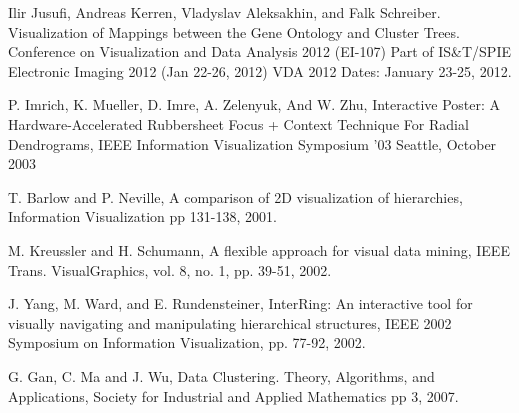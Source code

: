 
\begin{thebibliography}{99}

Ilir Jusufi, Andreas Kerren, Vladyslav Aleksakhin, and Falk Schreiber. Visualization of Mappings between the Gene Ontology and Cluster Trees. Conference on Visualization and Data Analysis 2012 (EI-107) Part of IS&T/SPIE Electronic Imaging 2012 (Jan 22-26, 2012) VDA 2012 Dates: January 23-25, 2012.


P. Imrich, K. Mueller, D. Imre, A. Zelenyuk, And W. Zhu, Interactive Poster: A Hardware-Accelerated Rubbersheet Focus + Context Technique For Radial Dendrograms, IEEE Information Visualization Symposium '03 Seattle, October 2003


T. Barlow and P. Neville, A comparison of 2D visualization of hierarchies, Information Visualization pp 131-138, 2001.

M. Kreussler and H. Schumann, A flexible approach for visual data mining, IEEE Trans. VisualGraphics, vol. 8, no. 1, pp. 39-51, 2002.

J. Yang, M. Ward, and E. Rundensteiner, InterRing: An interactive tool for visually navigating and manipulating hierarchical structures, IEEE 2002 Symposium on Information Visualization, pp. 77-92, 2002.







G. Gan, C. Ma and J. Wu, Data Clustering. Theory, Algorithms, and Applications, Society for Industrial and Applied Mathematics pp 3, 2007.


\end{thebibliography}
